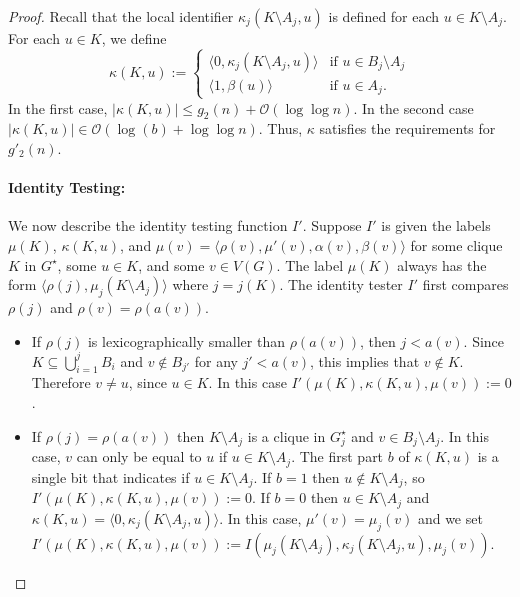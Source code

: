 \documentclass{patmorin}
\renewcommand{\le}{\leqslant}
\newcommand{\Oh}{\mathcal{O}}
\begin{document}
\begin{proof}
    Recall that the local identifier $\kappa_j(K\setminus A_j,u)$ is defined for each $u\in K\setminus A_j$.
    For each $u\in K$, we define
    \[
         \kappa(K,u):=
         \begin{cases}
           \langle 0,\kappa_j(K\setminus A_j,u)\rangle & \text{if $u\in B_j\setminus A_j$} \\
           \langle 1,\beta(u)\rangle & \text{if $u\in A_j$.}
         \end{cases}
     \]
     In the first case, $|\kappa(K,u)|\le g_2(n)+\Oh(\log\log n)$.
     In the second case $|\kappa(K,u)|\in \Oh(\log (b)+\log\log n)$.  Thus, $\kappa$ satisfies the requirements for $g'_2(n)$.


     \paragraph{Identity Testing:}
     We now describe the identity testing function $I'$.
     Suppose $I'$ is given the labels $\mu(K)$, $\kappa(K,u)$, and $\mu(v)=\langle \rho(v),\mu'(v),\alpha(v),\beta(v)\rangle$ for some clique $K$ in $G^\star$, some $u\in K$, and some $v\in V(G)$. The label $\mu(K)$ always has the form $\langle\rho(j),\mu_j(K\setminus A_j)\rangle$ where $j=j(K)$.
     The identity tester $I'$ first compares $\rho(j)$ and $\rho(v)=\rho(a(v))$.
     \begin{itemize}
       \item If $\rho(j)$ is lexicographically smaller than $\rho(a(v))$, then $j<a(v)$.  Since $K\subseteq\bigcup_{i=1}^j B_i$ and $v\not\in B_{j'}$ for any $j'<a(v)$, this implies that $v\not\in K$.  Therefore $v\neq u$, since $u\in K$. In this case $I'(\mu(K),\kappa(K,u),\mu(v)):=0$.

       \item If $\rho(j)=\rho(a(v))$ then $K\setminus A_j$ is a clique in $G^\star_j$ and $v\in B_j\setminus A_j$.
       In this case, $v$ can only be equal to $u$ if $u\in K\setminus A_j$.
       The first part $b$ of $\kappa(K,u)$ is a single bit that indicates if $u\in K\setminus A_j$.  If $b=1$ then $u\not\in K\setminus A_j$, so $I'(\mu(K),\kappa(K,u),\mu(v)):=0$.  If $b=0$ then $u\in K\setminus A_j$ and $\kappa(K,u)=\langle 0,\kappa_j(K\setminus A_j,u)\rangle$.
       In this case, $\mu'(v)=\mu_j(v)$ and we set
       $I'(\mu(K),\kappa(K,u),\mu(v)):=I(\mu_j(K\setminus A_j),\kappa_j(K\setminus A_j,u),\mu_j(v))$.


\end{itemize}
\end{proof}
\end{document}
